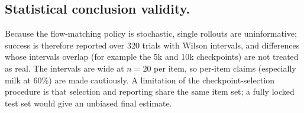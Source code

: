 \subsection{Statistical conclusion validity.} Because the flow-matching policy is
stochastic, single rollouts are uninformative; success is therefore reported over
320 trials with Wilson intervals, and differences whose intervals overlap (for
example the 5k and 10k checkpoints) are not treated as real. The intervals are wide
at $n=20$ per item, so per-item claims (especially milk at 60\%) are made
cautiously. A limitation of the checkpoint-selection procedure is that selection and
reporting share the same item set; a fully locked test set would give an unbiased
final estimate.
